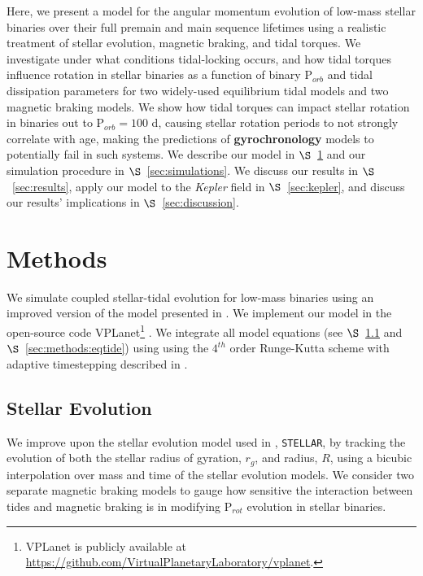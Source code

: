 \documentclass[twocolumn]{aastex61}
\newcommand{\xxx}[1]{{\textbf{#1}}}
\newcommand{\stellar}[0]{\texttt{STELLAR}\xspace}
\newcommand{\kepler}[0]{\textit{Kepler}\xspace}
\begin{document}
Here, we present a model for the angular momentum evolution of low-mass stellar binaries over their full premain and main sequence lifetimes using a realistic treatment of stellar evolution, magnetic braking, and tidal torques. We investigate under what conditions tidal-locking occurs, and how tidal torques influence rotation in stellar binaries as a function of binary P$_{orb}$ and tidal dissipation parameters for two widely-used equilibrium tidal models and two magnetic braking models.  We show how tidal torques can impact stellar rotation in binaries out to P$_{orb} = 100$ d, causing stellar rotation periods to not strongly correlate with age, making the predictions of \xxx{gyrochronology} models to potentially fail in such systems.  We describe our model in $\S$~\ref{sec:methods} and our simulation procedure in $\S$~\ref{sec:simulations}.  We discuss our results in $\S$~\ref{sec:results}, apply our model to the \kepler field in $\S$~\ref{sec:kepler}, and discuss our results' implications in $\S$~\ref{sec:discussion}.


\section{Methods} \label{sec:methods}

We simulate coupled stellar-tidal evolution for low-mass binaries using an improved version of the model presented in \citet{Fleming2018}.  We implement our model in the open-source code VPLanet\footnote{VPLanet is publicly available
at \href{https://github.com/VirtualPlanetaryLaboratory/vplanet}{{https://github.com/VirtualPlanetaryLaboratory/vplanet}}.} \citep[][Barnes et al., in prep]{Barnes2016,vplanet2018}.  We integrate all model equations (see $\S$~\ref{sec:methods:stellar} and $\S$~\ref{sec:methods:eqtide}) using using the $4^{th}$ order Runge-Kutta scheme with adaptive timestepping described in \citet{Fleming2018}.  

\subsection{Stellar Evolution} \label{sec:methods:stellar}

We improve upon the stellar evolution model used in \citet{Fleming2018}, \stellar, by tracking the evolution of both the stellar radius of gyration, $r_g$, and radius, $R$, using a bicubic interpolation over mass and time of the \citet{Baraffe2015} stellar evolution models. We consider two separate magnetic braking models to gauge how sensitive the interaction between tides and magnetic braking is in modifying P$_{rot}$ evolution in stellar binaries. 
\end{document}

